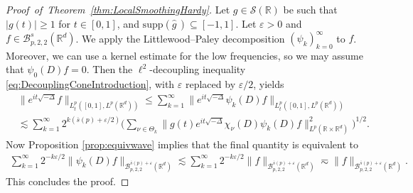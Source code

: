 \documentclass{amsart}
\theoremstyle{definition}
\newcommand{\R}{\mathbb{R}}
\newcommand {\Rd}{\mathbb{R}^{d}}
\newcommand {\Ba}{\mathcal{B}}
\newcommand {\supp}{\mathrm{supp}}
\newcommand{\wh}{\widehat}
\newcommand {\Sw}{\mathcal{S}}
\newcommand {\veps}{\varepsilon}
\numberwithin{equation}{section}
\begin{document}
\begin{proof}[Proof~of~Theorem~\ref{thm:LocalSmoothingHardy}]
Let $g\in\Sw(\R)$ be such that $|g(t)|\geq1$ for $t\in[0,1]$, and $\supp(\wh{g}\,)\subseteq [-1,1]$. Let $\veps>0$ and $f\in\Ba^{s}_{p,2,2}(\Rd)$. We apply the Littlewood--Paley decomposition $(\psi_{k})_{k=0}^{\infty}$ to $f$. Moreover, we can use a kernel estimate for the low frequencies, so we may assume that $\psi_{0}(D)f=0$. Then the $\ell^{2}$-decoupling inequality \eqref{eq:DecouplingConeIntroduction}, with $\veps$ replaced by $\veps/2$, yields
\begin{align*}
&\| e^{it \sqrt{- \Delta}} f \|_{L_t^p([0,1],L^p(\R^d))} \leq  \sum_{k=1}^{\infty}\|e^{it \sqrt{- \Delta}} \psi_{k}(D)f \|_{L_t^p([0,1],L^p(\R^d))}\\
&\lesssim \sum_{k=1}^{\infty}2^{k(\overline{s}(p) + \varepsilon/2)} \Big( \sum_{\nu\in\Theta_{k}} \|g(t)e^{it \sqrt{- \Delta}} \chi_\nu(D)\psi_{k}(D)f \|^2_{L^p(\R\times\Rd)} \Big)^{1/2}.
\end{align*}
Now Proposition \ref{prop:equivwave} implies that the final quantity is equivalent to 
\begin{align*}
\sum_{k=1}^{\infty}2^{-k\varepsilon/2} \|\psi_{k}(D)f\|_{\Ba^{\overline{s}(p)+\veps}_{p,2,2}(\Rd)}\lesssim \sum_{k=1}^{\infty}2^{-k\varepsilon/2} \|f\|_{\Ba^{\overline{s}(p)+\veps}_{p,2,2}(\Rd)}\eqsim \|f\|_{\Ba^{\overline{s}(p)+\veps}_{p,2,2}(\Rd)}.
\end{align*}
This concludes the proof.
\end{proof}
\end{document}
